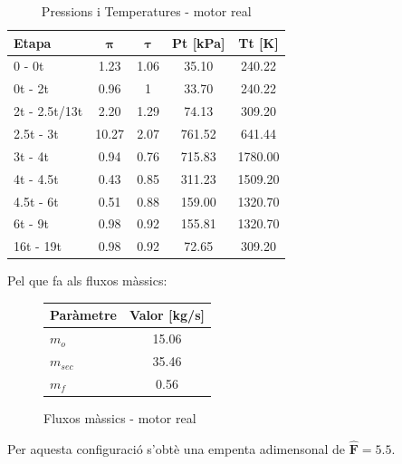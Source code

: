 \begin{table}[H]
\centering
\begin{tabular}{lcccc}
\toprule[3pt]
\textbf{Etapa} &\textbf{$\bm{\pi}$} & \textbf{$\bm{\tau}$}    & \textbf{Pt} [kPa]  & \textbf{Tt} [K]  \\
\midrule[1pt]
0 - 0t     & 1.23   & 1.06  & 35.10   & 240.22             \\
0t - 2t     & 0.96   & 1  & 33.70   & 240.22             \\
2t - 2.5t/13t     & 2.20   & 1.29  & 74.13   & 309.20             \\
2.5t - 3t     & 10.27  & 2.07  & 761.52   & 641.44             \\
3t - 4t     & 0.94     & 0.76  & 715.83  & 1780.00             \\
4t - 4.5t     & 0.43   & 0.85  & 311.23   & 1509.20             \\
4.5t - 6t     & 0.51   & 0.88  & 159.00   & 1320.70             \\
6t - 9t     & 0.98   & 0.92  & 155.81   & 1320.70            \\
16t - 19t     & 0.98   & 0.92  & 72.65   & 309.20            \\
\bottomrule[2pt]
\end{tabular}
\caption{Pressions i Temperatures - motor real}
\end{table}
Pel que fa als fluxos màssics:
\begin{figure}[H]
	\centering
	\begin{tabular}{lc}
		\toprule[3pt]
		\textbf{Paràmetre}&\textbf{Valor [kg/s]}\\
		\midrule[1pt]
		$m_{o}$ & 15.06 \\
		$m_{sec}$ & 35.46 \\
		$m_{f}$ & 0.56 \\
		\bottomrule[2pt]
	\end{tabular}
	\label{C_opti2}
	\caption{Fluxos màssics - motor real}
\end{figure}
Per aquesta configuració s'obtè una empenta adimensonal de $\bm{\hat{F} = 5.5}$.